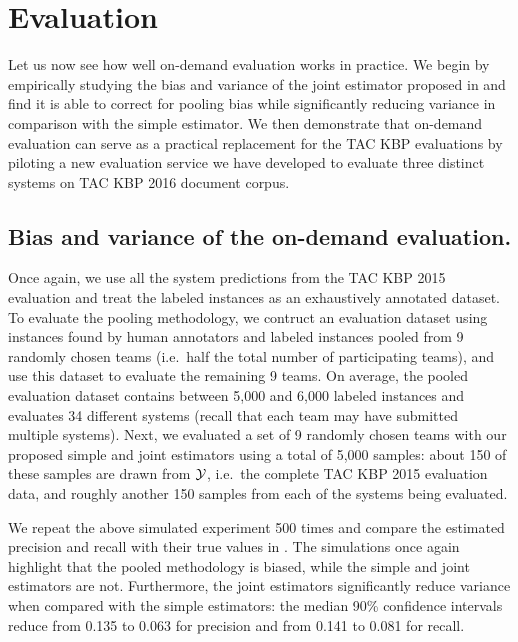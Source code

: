 
\section{Evaluation}
\label{sec:evaluation}

Let us now see how well on-demand evaluation works in practice.
We begin by empirically studying the bias and variance of the joint estimator proposed in  and find it is able to correct for pooling bias while significantly reducing variance in comparison with the simple estimator.
We then demonstrate that on-demand evaluation can serve as a practical replacement for the TAC KBP evaluations by piloting a new evaluation service we have developed to evaluate three distinct systems on TAC KBP 2016 document corpus.

\subsection{Bias and variance of the on-demand evaluation.}
Once again, we use all the system predictions from the TAC KBP 2015 evaluation and treat the labeled instances as an exhaustively annotated dataset.
To evaluate the pooling methodology, we contruct an evaluation dataset using
instances found by human annotators and labeled instances pooled from 9
randomly chosen teams (i.e.\ half the total number of participating teams), and
use this dataset to evaluate the remaining 9 teams.
On average, the pooled evaluation dataset contains between 5,000 and 6,000 labeled instances and evaluates 34 different systems (recall that each team may have submitted multiple systems).
Next, we evaluated a set of 9 randomly chosen teams with our proposed simple and joint estimators using a total of 5,000 samples:
about 150 of these samples are drawn from $\mathcal{Y}$, i.e.\ the complete TAC KBP 2015 evaluation data, and roughly another 150 samples from each of the systems being evaluated.

We repeat the above simulated experiment 500 times and compare the estimated precision and recall with their true values in .
The simulations once again highlight that the pooled methodology is biased, while the simple and joint estimators are not.
Furthermore, the joint estimators significantly reduce variance when compared with the simple estimators:
the median 90\% confidence intervals reduce from 0.135 to 0.063 for precision and from 0.141 to 0.081 for recall.

